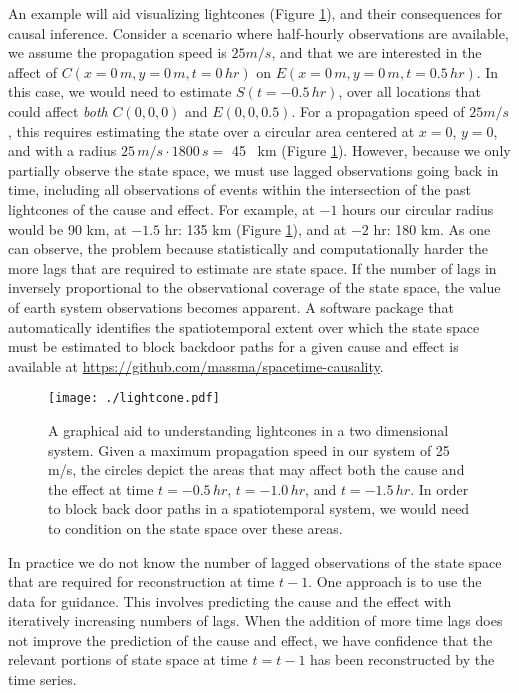 \documentclass[12pt]{article}
\begin{document}
An example will aid visualizing lightcones (Figure
\ref{fig:lightcone}), and their consequences for causal
inference. Consider a scenario where half-hourly observations are
available, we assume the propagation speed is $25 m/s$, and that we
are interested in the affect of $C(x=0 \, m, y=0 \, m, t=0 \, hr)$ on
$E(x=0 \, m, y=0 \, m , t=0.5 \, hr)$. In this case, we would need to
estimate $S(t=-0.5 \, hr)$, over all locations that could affect
\emph{both} $C(0,0,0)$ and $E(0,0,0.5)$.  For a propagation speed of
$25 m/s$, this requires estimating the state over a circular area
centered at $x=0$, $y=0$, and with a radius
$25 \, m/s \cdot 1800 \, s = $ 45 \, km (Figure
\ref{fig:lightcone}). However, because we only partially observe the
state space, we must use lagged observations going back in time,
including all observations of events within the intersection of the
past lightcones of the cause and effect. For example, at $-1$ hours
our circular radius would be 90 km, at $-1.5$ hr: 135 km (Figure
\ref{fig:lightcone}), and at $-2$ hr: 180 km. As one can observe, the
problem because statistically and computationally harder the more lags
that are required to estimate are state space. If the number of lags
in inversely proportional to the observational coverage of the state
space, the value of earth system observations becomes apparent. A
software package that automatically identifies the spatiotemporal
extent over which the state space must be estimated to block backdoor
paths for a given cause and effect is available at
\url{https://github.com/massma/spacetime-causality}.

\begin{figure}
  \texttt{[image: ./lightcone.pdf]}
  \caption{A graphical aid to understanding lightcones in a two
    dimensional system. Given a maximum propagation speed in our
    system of 25 m/s, the circles depict the areas that may affect
    both the cause and the effect at time $t=-0.5 \, hr$,
    $t=-1.0 \, hr$, and $t=-1.5 \, hr$. In order to block back door
    paths in a spatiotemporal system, we would need to condition on
    the state space over these areas.}
  \label{fig:lightcone}
\end{figure}

In practice we do not know the number of lagged observations of the
state space that are required for reconstruction at time $t-1$. One
approach is to use the data for guidance. This involves predicting the
cause and the effect with iteratively increasing numbers of lags. When
the addition of more time lags does not improve the prediction of the
cause and effect, we have confidence that the relevant portions of
state space at time $t=t-1$ has been reconstructed by the time series.
\end{document}
